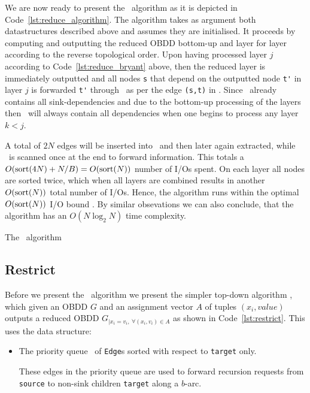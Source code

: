 We are now ready to present the \Reduce\ algorithm as it is depicted in
Code~\ref{lst:reduce_algorithm}. The algorithm takes as argument both
datastructures described above and assumes they are initialised. It proceeds by
computing and outputting the reduced OBDD bottom-up and layer for layer
according to the reverse topological order. Upon having processed layer $j$
according to Code~\ref{lst:reduce_bryant} above, then the reduced layer is
immediately outputted and all nodes \lstinline{s} that depend on the outputted
node \lstinline{t'} in layer $j$ is forwarded \lstinline{t'} through
\ReduceQdep\ as per the edge \lstinline{(s,t)} in \ReduceLforward. Since
\ReduceQdep\ already contains all sink-dependencies and due to the bottom-up
processing of the layers then \ReduceQdep\ will always contain all dependencies
when one begins to process any layer $k < j$.

A total of $2 N$ edges will be inserted into \ReduceQdep\ and then later again
extracted, while \ReduceLforward\ is scanned once at the end to forward
information. This totals a $O(\text{sort}(4N) + N/B) = O(\text{sort}(N))$ number of I/Os
spent. On each layer all nodes are sorted twice, which when all layers are
combined results in another $O(\text{sort}(N))$ total number of I/Os. Hence, the
algorithm runs within the optimal $O(\text{sort}(N))$ I/O bound \cite{Arge96}. By
similar obsevations we can also conclude, that the algorithm has an $O(N \log_2
N)$ time complexity.

\begin{lstfloat}
  \centering

  

  \caption{The \Reduce\ algorithm}
  \label{lst:reduce_algorithm}
\end{lstfloat}

\clearpage
\subsection{Restrict} \label{sec:theory__restrict}
Before we present the \Apply\ algorithm we present the simpler top-down
algorithm \Restrict, which given an OBDD $G$ and an assignment vector $A$ of
tuples $(x_i, \mathit{value})$ outputs a reduced OBDD $G_{| x_i = v_i ,\ \forall
  (x_i,v_i) \in A}$ as shown in Code~\ref{lst:restrict}. This uses the data
structure:

\begin{itemize}
\item The priority queue \RestrictQrec\ of \lstinline{Edge}s sorted with respect
  to \lstinline{target} only.

  These edges in the priority queue are used to forward recursion requests from
  \lstinline{source} to non-sink children \lstinline{target} along a $b$-arc.
\end{itemize}


